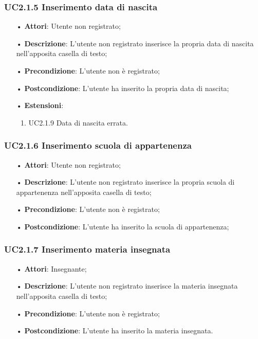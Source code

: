 \subsubsection{UC2.1.5 Inserimento data di nascita}
\begin{itemize}
	\item[•] \textbf{Attori}: Utente non registrato;
	\item[•] \textbf{Descrizione}: L'utente non registrato inserisce la propria data di nascita nell'apposita casella di testo;
	\item[•] \textbf{Precondizione}: L’utente non è registrato;
	\item[•] \textbf{Postcondizione}: L'utente ha inserito la propria data di nascita;
	\item[•] \textbf{Estensioni}:
		\begin{enumerate}
			\item UC2.1.9 Data di nascita errata.
		\end{enumerate}
\end{itemize}

\subsubsection{UC2.1.6 Inserimento scuola di appartenenza}
\begin{itemize}
	\item[•] \textbf{Attori}: Utente non registrato;
	\item[•] \textbf{Descrizione}: L'utente non registrato inserisce la propria scuola di appartenenza nell'apposita casella di testo;
	\item[•] \textbf{Precondizione}: L’utente non è registrato;
	\item[•] \textbf{Postcondizione}: L'utente ha inserito la scuola di appartenenza;
\end{itemize}

\subsubsection{UC2.1.7 Inserimento materia insegnata}
\begin{itemize}
	\item[•] \textbf{Attori}: Insegnante;
	\item[•] \textbf{Descrizione}: L'utente non registrato inserisce la materia insegnata nell'apposita casella di testo;
	\item[•] \textbf{Precondizione}: L’utente non è registrato;
	\item[•] \textbf{Postcondizione}: L'utente ha inserito la materia insegnata.
\end{itemize}

